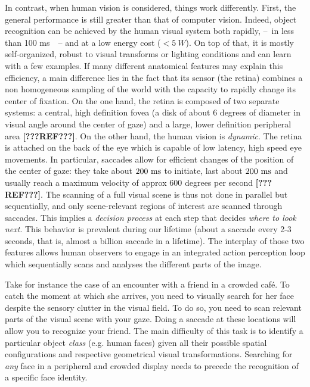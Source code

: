 In contrast, when human vision is considered, things work differently. First, the  general performance is still greater than that of computer vision.
Indeed, object recognition can be achieved by the human visual system both rapidly, --~in less than 100 ms~\cite{Kirchner06}~-- and at a low energy cost ($<5~W$). 
On top of that, it is mostly self-organized, robust to visual transforms or lighting conditions and can learn with a few examples. If many different anatomical features may explain this efficiency, a main difference lies in the fact that its sensor (the retina) combines a non homogeneous sampling of the world with the capacity to rapidly change its center of fixation. On the one hand, the retina is composed of two separate systems: a central, high definition fovea (a disk of about 6 degrees of diameter in visual angle around the center of gaze) and a large, lower definition peripheral area {\color{red} \textbf{[???REF???]}}. 
On the other hand, the human vision is \emph{dynamic}. The retina is attached on the back of the eye which is capable of low latency, high speed eye movements. In particular, saccades allow for efficient changes of the position of the center of gaze: they take about $200~\si{\milli\second}$ to initiate, last about $200~\si{\milli\second}$ and usually reach a maximum velocity of approx 600 degrees per second {\color{red} \textbf{[???REF???]}}. The scanning of a full visual scene is thus  not done in parallel but sequentially, and only scene-relevant regions of interest are scanned through saccades. This implies a \emph{decision process} at each step that decides \emph{where to look next}. This behavior is prevalent during our lifetime (about a saccade every 2-3 seconds, that is, almost a billion saccade in a lifetime). The interplay of those two features allows human observers to engage in an integrated action perception loop which sequentially scans and analyses the different parts of the image.


Take for instance the case of an encounter with a friend in a crowded café. To catch the moment at which she arrives, you need to visually search for her face despite the sensory clutter in the visual field. To do so, you need to scan relevant parts of the visual scene with your gaze. Doing a saccade at these locations will allow you to recognize your friend. The main difficulty of this task is to identify a particular object \emph{class} (e.g. human faces) given all their possible spatial configurations and respective geometrical visual transformations. Searching for \emph{any} face in a peripheral and crowded display needs to precede the recognition of a specific face identity. 


